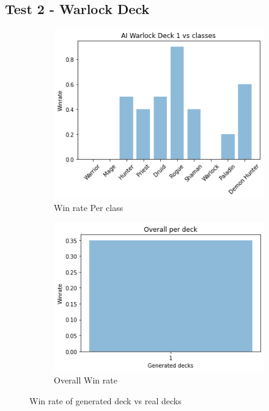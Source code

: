 \documentclass{report} %
\begin{document}
\subsection{Test 2 - Warlock Deck}
\begin{figure}[H]
\centering
\begin{subfigure}{.5\textwidth}
 \centering
 \includegraphics[width=1\linewidth]{TestImages/WarlockDeckWinrateClasses}
 \caption{Win rate Per class}
\end{subfigure}%
\begin{subfigure}{.5\textwidth}
 \centering
 \includegraphics[width=1\linewidth]{TestImages/WarlockAllGeneratedDeckOverallWinrate}
 \caption{Overall Win rate}
\end{subfigure}
\caption{Win rate of generated deck vs real decks}
\end{figure}
\end{document}
